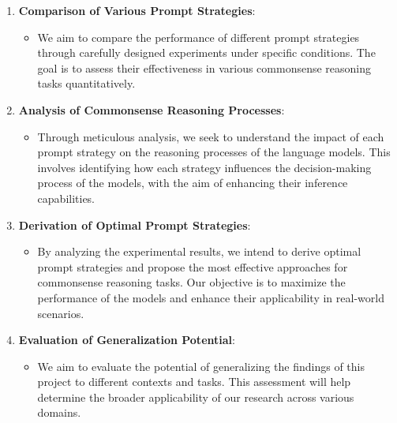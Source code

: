 \documentclass[fleqn,moreauthors,10pt]{ds_report}
\begin{document}
\begin{enumerate}
    \item \textbf{Comparison of Various Prompt Strategies}:
    \begin{itemize}
        \item We aim to compare the performance of different prompt strategies through carefully designed experiments under specific conditions. The goal is to assess their effectiveness in various commonsense reasoning tasks quantitatively.
    \end{itemize}
    
    \item \textbf{Analysis of Commonsense Reasoning Processes}:
    \begin{itemize}
        \item Through meticulous analysis, we seek to understand the impact of each prompt strategy on the reasoning processes of the language models. This involves identifying how each strategy influences the decision-making process of the models, with the aim of enhancing their inference capabilities.
    \end{itemize}
    
    \item \textbf{Derivation of Optimal Prompt Strategies}:
    \begin{itemize}
        \item By analyzing the experimental results, we intend to derive optimal prompt strategies and propose the most effective approaches for commonsense reasoning tasks. Our objective is to maximize the performance of the models and enhance their applicability in real-world scenarios.
    \end{itemize}
    
    \item \textbf{Evaluation of Generalization Potential}:
    \begin{itemize}
        \item We aim to evaluate the potential of generalizing the findings of this project to different contexts and tasks. This assessment will help determine the broader applicability of our research across various domains.
    \end{itemize}
\end{enumerate}


\end{document}
